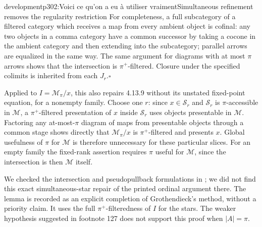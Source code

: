 \begin{dcomment}{development}{p302:Voici ce qu'on a eu à utiliser vraiment}{Simultaneous refinement removes the regularity restriction}
For completeness, a full subcategory of a filtered category which receives a map from every ambient object is cofinal: any two objects in a comma category have a common successor by taking a cocone in the ambient category and then extending into the subcategory; parallel arrows are equalized in the same way. The same argument for diagrams with at most $\pi$ arrows shows that the intersection is $\pi^+$-filtered. Closure under the specified colimits is inherited from each $J_r$.\hfill$\square$

Applied to $I=\mathcal M_\pi/x$, this also repairs 4.13.9 without its unstated fixed-point equation, for a nonempty family. Choose one $r$: since $x\in\mathcal S_r$ and $\mathcal S_r$ is $\pi$-accessible in $\mathcal M$, a $\pi^+$-filtered presentation of $x$ inside $\mathcal S_r$ uses objects presentable in $\mathcal M$. Factoring any at-most-$\pi$ diagram of maps from presentable objects through a common stage shows directly that $\mathcal M_\pi/x$ is $\pi^+$-filtered and presents $x$. Global usefulness of $\pi$ for $\mathcal M$ is therefore unnecessary for these particular slices. For an empty family the fixed-rank assertion requires $\pi$ useful for $\mathcal M$, since the intersection is then $\mathcal M$ itself.

We checked the intersection and pseudopullback formulations in \citet{Lurie2009HTT,ChornyRosicky2012,Positselski2024Limits}; we did not find this exact simultaneous-star repair of the printed ordinal argument there. The lemma is recorded as an explicit completion of Grothendieck's method, without a priority claim. It uses the full $\pi^+$-filteredness of $I$ for the stars. The weaker hypothesis suggested in footnote 127 does not support this proof when $|A|=\pi$.
\end{dcomment}

